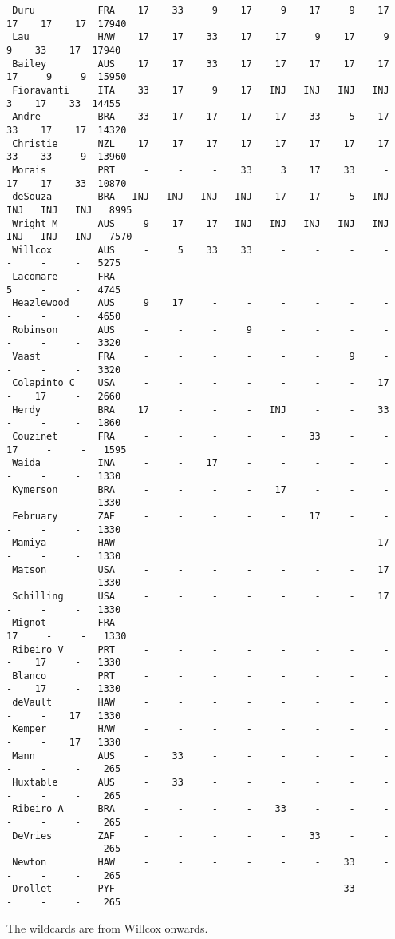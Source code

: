 \documentclass[12pt]{article}
\begin{document}
{\begin{verbatim}
 Duru           FRA    17    33     9    17     9    17     9    17    17    17    17  17940
 Lau            HAW    17    17    33    17    17     9    17     9     9    33    17  17940
 Bailey         AUS    17    17    33    17    17    17    17    17    17     9     9  15950
 Fioravanti     ITA    33    17     9    17   INJ   INJ   INJ   INJ     3    17    33  14455
 Andre          BRA    33    17    17    17    17    33     5    17    33    17    17  14320
 Christie       NZL    17    17    17    17    17    17    17    17    33    33     9  13960
 Morais         PRT     -     -     -    33     3    17    33     -    17    17    33  10870
 deSouza        BRA   INJ   INJ   INJ   INJ    17    17     5   INJ   INJ   INJ   INJ   8995
 Wright_M       AUS     9    17    17   INJ   INJ   INJ   INJ   INJ   INJ   INJ   INJ   7570
 Willcox        AUS     -     5    33    33     -     -     -     -     -     -     -   5275
 Lacomare       FRA     -     -     -     -     -     -     -     -     5     -     -   4745
 Heazlewood     AUS     9    17     -     -     -     -     -     -     -     -     -   4650
 Robinson       AUS     -     -     -     9     -     -     -     -     -     -     -   3320
 Vaast          FRA     -     -     -     -     -     -     9     -     -     -     -   3320
 Colapinto_C    USA     -     -     -     -     -     -     -    17     -    17     -   2660
 Herdy          BRA    17     -     -     -   INJ     -     -    33     -     -     -   1860
 Couzinet       FRA     -     -     -     -     -    33     -     -    17     -     -   1595
 Waida          INA     -     -    17     -     -     -     -     -     -     -     -   1330
 Kymerson       BRA     -     -     -     -    17     -     -     -     -     -     -   1330
 February       ZAF     -     -     -     -     -    17     -     -     -     -     -   1330
 Mamiya         HAW     -     -     -     -     -     -     -    17     -     -     -   1330
 Matson         USA     -     -     -     -     -     -     -    17     -     -     -   1330
 Schilling      USA     -     -     -     -     -     -     -    17     -     -     -   1330
 Mignot         FRA     -     -     -     -     -     -     -     -    17     -     -   1330
 Ribeiro_V      PRT     -     -     -     -     -     -     -     -     -    17     -   1330
 Blanco         PRT     -     -     -     -     -     -     -     -     -    17     -   1330
 deVault        HAW     -     -     -     -     -     -     -     -     -     -    17   1330
 Kemper         HAW     -     -     -     -     -     -     -     -     -     -    17   1330
 Mann           AUS     -    33     -     -     -     -     -     -     -     -     -    265
 Huxtable       AUS     -    33     -     -     -     -     -     -     -     -     -    265
 Ribeiro_A      BRA     -     -     -     -    33     -     -     -     -     -     -    265
 DeVries        ZAF     -     -     -     -     -    33     -     -     -     -     -    265
 Newton         HAW     -     -     -     -     -     -    33     -     -     -     -    265
 Drollet        PYF     -     -     -     -     -     -    33     -     -     -     -    265
\end{verbatim}
}
The wildcards are from Willcox onwards.
\end{document}
